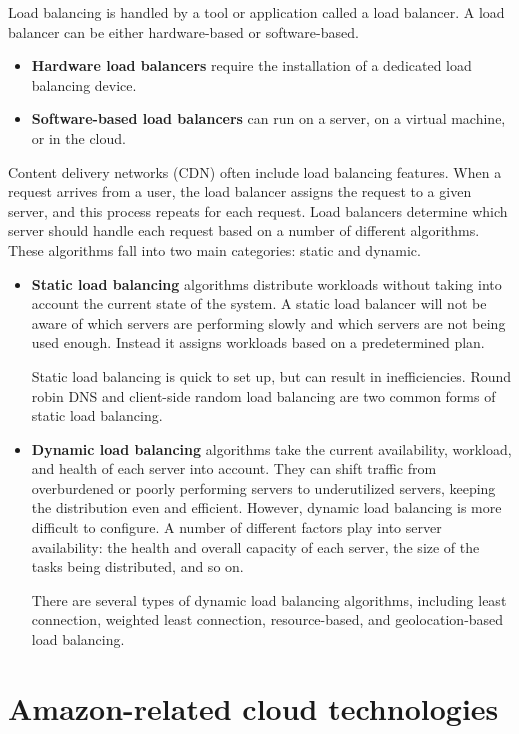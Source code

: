 		Load balancing is handled by a tool or application called a load balancer. A load balancer can be 
		either hardware-based or software-based. 
		\begin{itemize}
			\item \textbf{Hardware load balancers} require the installation of a 
		dedicated load balancing device.
			\item \textbf{Software-based load balancers} can run on a server, on a virtual machine, 
		or in the cloud.
		\end{itemize}
		Content delivery networks (CDN) often include load balancing features.
		When a request arrives from a user, the load balancer assigns the request to a given server, 
		and this process repeats for each request. Load balancers determine which server should handle each request 
		based on a number of different algorithms. These algorithms fall into two main categories: static and dynamic.

		\begin{itemize}
			\item \textbf{Static load balancing} algorithms distribute workloads without taking into account the current 
			state of the system. A static load balancer will not be aware of which servers are performing 
			slowly and which servers are not being used enough. 
			Instead it assigns workloads based on a predetermined plan. 
			
			Static load balancing is quick to set up,
			but can result in inefficiencies. Round robin DNS and client-side random load balancing are 
			two common forms of static load balancing.
			\item \textbf{Dynamic load balancing} algorithms take the current availability, workload, 
			and health of each server into account. 
			They can shift traffic from overburdened or poorly performing servers to underutilized servers, 
			keeping the distribution even and efficient. However, dynamic load balancing is more difficult 
			to configure. A number of different factors play into server availability: 
			the health and overall capacity of each server, the size of the tasks being distributed, and so on.

			There are several types of dynamic load balancing algorithms, including least connection, weighted least connection, resource-based, and geolocation-based load balancing.
		\end{itemize}

\section{Amazon-related cloud technologies}
